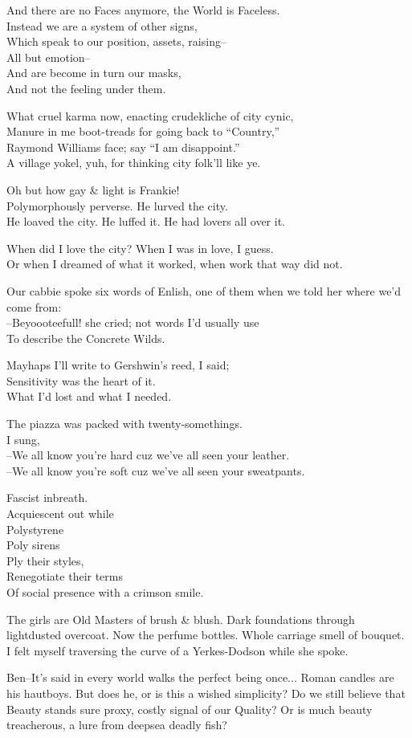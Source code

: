 And there are no Faces anymore, the World is Faceless. \\
Instead we are a system of other signs, \\
Which speak to our position, assets, raising-- \\
All but emotion-- \\
And are become in turn our masks, \\
And not the feeling under them.

What cruel karma now, enacting crudekliche of city cynic, \\
Manure in me boot-treads for going back to ``Country,'' \\
Raymond Williams face; say ``I am disappoint.'' \\
A village yokel, yuh, for thinking city folk'll like ye.

Oh but how gay \& light is Frankie! \\
Polymorphously perverse. He lurved the city. \\
He loaved the city. He luffed it. He had lovers all over it.

When did I love the city? When I was in love, I guess. \\
Or when I dreamed of what it worked, when work that way did not.

Our cabbie spoke six words of Enlish, one of them when we told her where we'd come from: \\
--Beyoooteefull! she cried; not words I'd usually use \\
To describe the Concrete Wilds.

Mayhaps I'll write to Gershwin's reed, I said; \\
Sensitivity was the heart of it. \\
What I'd lost and what I needed.

The piazza was packed with twenty-somethings. \\
I sung, \\
--We all know you're hard cuz we've all seen your leather. \\
--We all know you're soft cuz we've all seen your sweatpants.

Fascist inbreath. \\
Acquiescent out while \\
Polystyrene \\
Poly sirens \\
Ply their styles, \\
Renegotiate their terms \\
Of social presence with a crimson smile.

The girls are Old Masters of brush \& blush. Dark foundations through  lightdusted overcoat. Now the perfume bottles. Whole carriage smell of bouquet. I felt myself traversing the curve of a Yerkes-Dodson while she spoke.

Ben--It's said in every world walks the perfect being once... Roman candles are his hautboys. But does he, or is this a wished simplicity? Do we still believe that Beauty stands sure proxy, costly signal of our Quality? Or is much beauty treacherous, a lure from deepsea deadly fish?